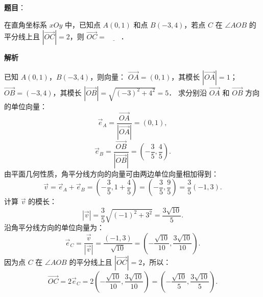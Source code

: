 \begin{answer}

\textbf{题目}：

在直角坐标系 $xOy$ 中，已知点 $A(0, 1)$ 和点 $B(-3, 4)$，若点 $C$ 在 $\angle AOB$ 的平分线上且 $|\vec{OC}| = 2$，则 $\vec{OC} = \underline{\hspace{2em}}$．

\textbf{解析}

已知 $A(0, 1)$，$B(-3, 4)$，则向量：
$\vec{OA} = (0, 1)$，其模长 $|\vec{OA}| = 1$；
$\vec{OB} = (-3, 4)$，其模长 $|\vec{OB}| = \sqrt{(-3)^2 + 4^2} = 5$．
求分别沿 $\vec{OA}$ 和 $\vec{OB}$ 方向的单位向量：
\nopagebreak[4]
\[
\vec{e}_A = \dfrac{\vec{OA}}{|\vec{OA}|} = (0, 1),
\]
\nopagebreak[4]
\[
\vec{e}_B = \dfrac{\vec{OB}}{|\vec{OB}|} = \left(-\dfrac{3}{5}, \dfrac{4}{5}\right).
\]
由平面几何性质，角平分线方向的向量可由两边单位向量相加得到：
\nopagebreak[4]
\[
\vec{v} = \vec{e}_A + \vec{e}_B = \left(-\dfrac{3}{5}, 1 + \dfrac{4}{5}\right) = \left(-\dfrac{3}{5}, \dfrac{9}{5}\right) = \dfrac{3}{5}(-1, 3).
\]
计算 $\vec{v}$ 的模长：
\nopagebreak[4]
\[
|\vec{v}| = \dfrac{3}{5}\sqrt{(-1)^2 + 3^2} = \dfrac{3\sqrt{10}}{5}.
\]
沿角平分线方向的单位向量为：
\nopagebreak[4]
\[
\vec{e}_C = \dfrac{\vec{v}}{|\vec{v}|} = \dfrac{(-1, 3)}{\sqrt{10}} = \left(-\dfrac{\sqrt{10}}{10}, \dfrac{3\sqrt{10}}{10}\right).
\]
因为点 $C$ 在 $\angle AOB$ 的平分线上且 $|\vec{OC}| = 2$，所以：
\nopagebreak[4]
\[
\vec{OC} = 2 \vec{e}_C = 2\left(-\dfrac{\sqrt{10}}{10}, \dfrac{3\sqrt{10}}{10}\right) = \left(-\dfrac{\sqrt{10}}{5}, \dfrac{3\sqrt{10}}{5}\right).
\]


\end{answer}
